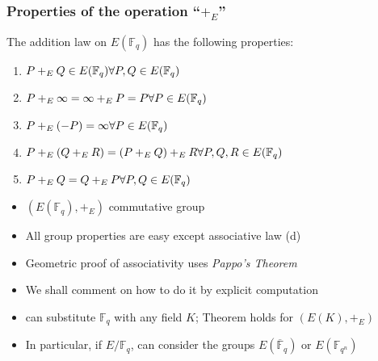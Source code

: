 \documentclass[10pt,handout]{beamer} %
\newcommand{\Q}{\mathbb Q}
\newcommand{\F}{\mathbb F}
\newcommand{\C}{\mathbb C}
\theoremstyle{definition}
\begin{document}
\begin{frame}
\frametitle{Properties of the operation ``$+_E$''}

\begin{Theorem}
 The addition law on $E(\F_q)$ has the following
properties:
\begin{enumerate}[<+-| alert@+>][(a)]
 \item $P+_EQ\in E(\F_q)\hfill\forall P,Q\in E(\F_q)$
 \item  $P+_E\infty=\infty+_E P=P\hfill\forall P\in E(\F_q)$
 \item  $P+_E(-P)=\infty\hfill\forall P\in E(\F_q)$
 \item  $P+_E(Q +_E R)=(P+_E Q)+_E R\hfill\forall P,Q,R\in E(\F_q)$
 \item  $P+_E Q=Q +_E P\hfill\forall P,Q\in E(\F_q)$
\end{enumerate}
 \end{Theorem}\pause

\begin{itemize}[<+-| alert@+>]
 \item $\left(E(\F_q),+_E\right)$  \alert{commutative group}
 \item All group properties are easy except \alert{associative law (d)}
 \item Geometric proof of associativity uses \emph{Pappo's Theorem}
 \item We shall comment on how to do it by explicit computation
 \item can substitute $\F_q$ with any field $K$; Theorem holds for $\left(E(K),+_E\right)$
\item In particular, if $E/\F_q$, can consider the groups $E(\overline{\F}_q)$ or $E(\F_{q^n})$
\end{itemize}
\end{frame}
\end{document}
